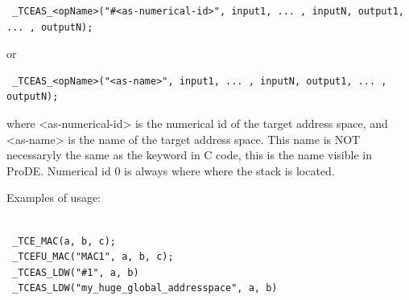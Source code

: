\documentclass[twoside]{tceusermanual}
\begin{document}
\begin{verbatim}
 _TCEAS_<opName>("#<as-numerical-id>", input1, ... , inputN, output1, ... , outputN);
\end{verbatim}

or

\begin{verbatim}
 _TCEAS_<opName>("<as-name>", input1, ... , inputN, output1, ... , outputN);
\end{verbatim}

where <as-numerical-id> is the numerical id  of the target address space, 
and <as-name> is the name of the target address space.
This name is NOT necessaryly the same as the keyword in C code,
this is the name visible in ProDE. Numerical id 0 is always where
where the stack is located.

Examples of usage:

\begin{verbatim}
 
 _TCE_MAC(a, b, c);
 _TCEFU_MAC("MAC1", a, b, c);
 _TCEAS_LDW("#1", a, b)
 _TCEAS_LDW("my_huge_global_addresspace", a, b)

\end{verbatim}


%

%
%
%
%
\end{document}
